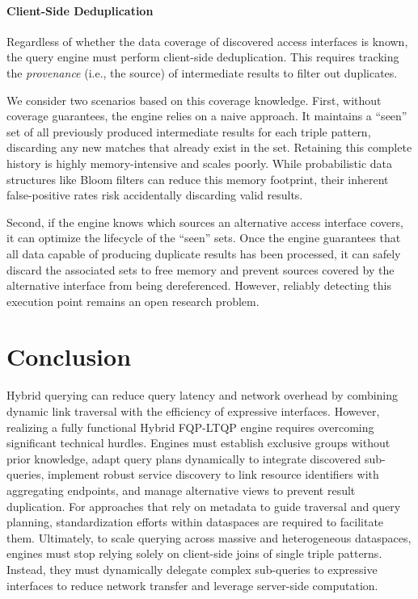 \documentclass{ceurart}
\theoremstyle{definition}
\begin{document}
\paragraph{Client-Side Deduplication}
Regardless of whether the data coverage of discovered access interfaces is known,
the query engine must perform client-side deduplication.
This requires tracking the \emph{provenance} (i.e., the source) of intermediate results to filter out duplicates.

We consider two scenarios based on this coverage knowledge.
First, without coverage guarantees, the engine relies on a naive approach.
It maintains a ``seen'' set of all previously produced intermediate results for each triple pattern,
discarding any new matches that already exist in the set.
Retaining this complete history is highly memory-intensive and scales poorly.
While probabilistic data structures like Bloom filters can reduce this memory footprint,
their inherent false-positive rates risk accidentally discarding valid results.

Second, if the engine knows which sources an alternative access interface covers,
it can optimize the lifecycle of the ``seen'' sets.
Once the engine guarantees that all data capable of producing duplicate results has been processed,
it can safely discard the associated sets to free memory and prevent sources covered by the alternative interface from being dereferenced.
However, reliably detecting this execution point remains an open research problem.

\section{Conclusion}

Hybrid querying can reduce query latency and network overhead by combining dynamic link traversal with the efficiency of expressive interfaces.
However, realizing a fully functional Hybrid FQP-LTQP engine requires overcoming significant technical hurdles.
Engines must establish exclusive groups without prior knowledge, adapt query plans dynamically to integrate discovered sub-queries,
implement robust service discovery to link resource identifiers with aggregating endpoints,
and manage alternative views to prevent result duplication.
For approaches that rely on metadata to guide traversal and query planning, 
standardization efforts within dataspaces are required to facilitate them.
Ultimately, to scale querying across massive and heterogeneous dataspaces,
engines must stop relying solely on client-side joins of single triple patterns.
Instead, they must dynamically delegate complex sub-queries to expressive interfaces to reduce network transfer and leverage server-side computation.
\end{document}
